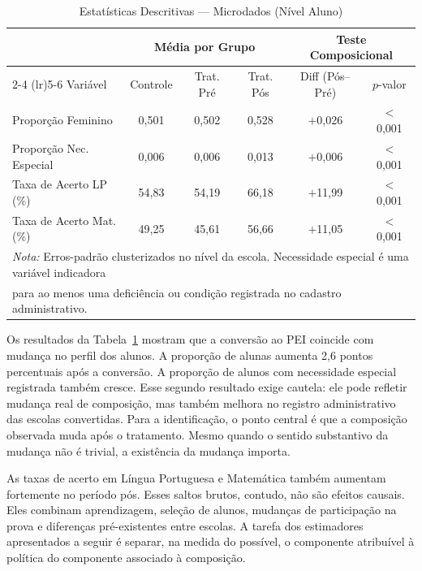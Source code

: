 \begin{table}[htbp]
\centering
\caption{Estatísticas Descritivas --- Microdados (Nível Aluno)}
\label{tab:micro}
\begin{tabular}{lccccc}
\toprule
 & \multicolumn{3}{c}{Média por Grupo} & \multicolumn{2}{c}{Teste Composicional} \\
\cmidrule(lr){2-4} \cmidrule(lr){5-6}
Variável & Controle & Trat. Pré & Trat. Pós & Diff (Pós--Pré) & $p$-valor \\
\midrule
Proporção Feminino        & 0,501 & 0,502 & 0,528 & $+$0,026 & $<$0,001 \\
Proporção Nec. Especial   & 0,006 & 0,006 & 0,013 & $+$0,006 & $<$0,001 \\
Taxa de Acerto LP (\%)    & 54,83 & 54,19 & 66,18 & $+$11,99 & $<$0,001 \\
Taxa de Acerto Mat. (\%)  & 49,25 & 45,61 & 56,66 & $+$11,05 & $<$0,001 \\
\bottomrule
\multicolumn{6}{l}{\footnotesize \textit{Nota:} Erros-padrão clusterizados no nível da escola. Necessidade especial é uma variável indicadora} \\
\multicolumn{6}{l}{\footnotesize para ao menos uma deficiência ou condição registrada no cadastro administrativo.} \\
\end{tabular}
\end{table}

Os resultados da Tabela~\ref{tab:micro} mostram que a conversão ao PEI coincide com mudança no perfil dos alunos. A proporção de alunas aumenta 2,6 pontos percentuais após a conversão. A proporção de alunos com necessidade especial registrada também cresce. Esse segundo resultado exige cautela: ele pode refletir mudança real de composição, mas também melhora no registro administrativo das escolas convertidas. Para a identificação, o ponto central é que a composição observada muda após o tratamento. Mesmo quando o sentido substantivo da mudança não é trivial, a existência da mudança importa.

As taxas de acerto em Língua Portuguesa e Matemática também aumentam fortemente no período pós. Esses saltos brutos, contudo, não são efeitos causais. Eles combinam aprendizagem, seleção de alunos, mudanças de participação na prova e diferenças pré-existentes entre escolas. A tarefa dos estimadores apresentados a seguir é separar, na medida do possível, o componente atribuível à política do componente associado à composição.

